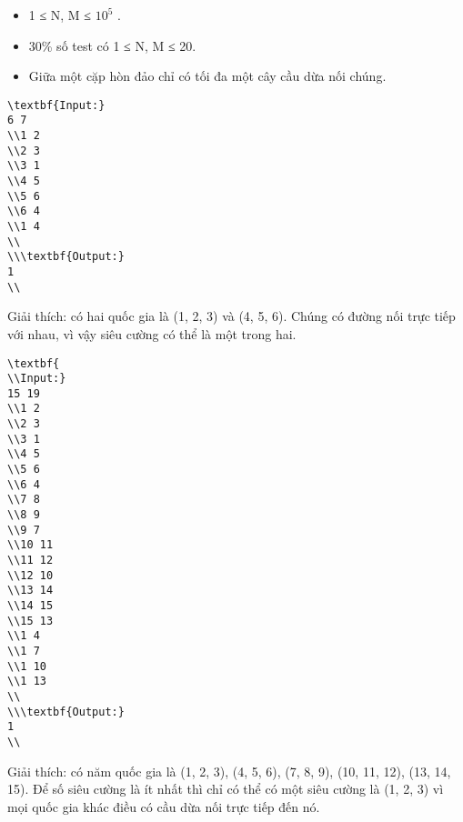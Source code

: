 \begin{itemize}
	\item     1 ≤ N, M ≤ $10^{5}$    .   
	\item     30\% số test có 1 ≤ N, M ≤ 20.   
	\item     Giữa một cặp hòn đảo chỉ có tối đa một cây cầu dừa nối chúng.   
\end{itemize}
\begin{verbatim}
\textbf{Input:}
6 7
\\1 2
\\2 3
\\3 1
\\4 5
\\5 6
\\6 4
\\1 4
\\
\\\textbf{Output:}
1
\\\end{verbatim}

Giải thích: có hai quốc gia là (1, 2, 3) và (4, 5, 6). Chúng có đường nối trực tiếp với nhau, vì vậy siêu cường có thể là một trong hai.
\begin{verbatim}
\textbf{
\\Input:}
15 19
\\1 2
\\2 3
\\3 1
\\4 5
\\5 6
\\6 4
\\7 8
\\8 9
\\9 7
\\10 11
\\11 12
\\12 10
\\13 14
\\14 15
\\15 13
\\1 4
\\1 7
\\1 10
\\1 13
\\
\\\textbf{Output:}
1
\\\end{verbatim}

Giải thích: có năm quốc gia là (1, 2, 3), (4, 5, 6), (7, 8, 9), (10, 11, 12), (13, 14, 15). Để số siêu cường là ít nhất thì chỉ có thể có một siêu cường là (1, 2, 3) vì mọi quốc gia khác điều có cầu dừa nối trực tiếp đến nó.
